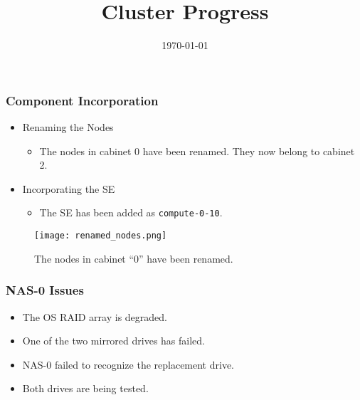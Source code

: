 \documentclass{beamer}
\title{Cluster Progress}
\date{\today}
\begin{document}

\begin{frame}
  \maketitle
\end{frame}



\begin{frame}

  \frametitle{Component Incorporation}

  \begin{multicols}{2}

    \begin{itemize}
    \item Renaming the Nodes
      \begin{itemize}
      \item The nodes in cabinet 0 have been renamed. They now belong to cabinet 2.
      \end{itemize}
    \item Incorporating the SE
      \begin{itemize}
      \item The SE has been added as {\tt compute-0-10}.
      \end{itemize}
    \end{itemize}

    \columnbreak

    \begin{figure}[H]
      \begin{center}
        \texttt{[image: renamed\_nodes.png]}
      \end{center}
      \caption{The nodes in cabinet ``0'' have been renamed.}
    \end{figure}

  \end{multicols}

\end{frame}




\begin{frame}

  \frametitle{NAS-0 Issues}

  \begin{itemize}
    \item The OS RAID array is degraded.
    \item One of the two mirrored drives has failed.
    \item NAS-0 failed to recognize the replacement drive.
    \item Both drives are being tested.
  \end{itemize}

\end{frame}

\end{document}
